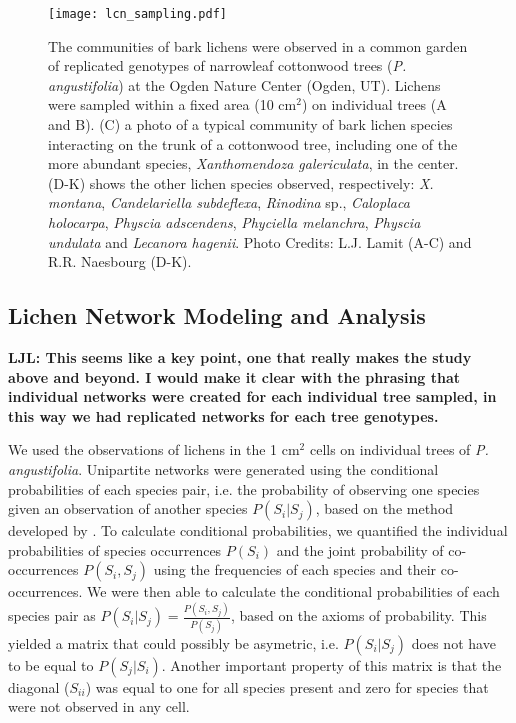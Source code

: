 \documentclass[9pt,twocolumn,twoside,lineno]{pnas-new}
\begin{document}
{\begin{figure}[ht]
\centering
\texttt{[image: lcn\_sampling.pdf]}
\caption{The communities of bark lichens were observed in a common
  garden of replicated genotypes of narrowleaf cottonwood trees
  (\textit{P. angustifolia}) at the Ogden Nature Center (Ogden,
  UT). Lichens were sampled within a fixed area (10 cm$^2$) on
  individual trees (A and B). (C) a photo of a typical community of
  bark lichen species interacting on the trunk of a cottonwood tree,
  including one of the more abundant species, \textit{Xanthomendoza
    galericulata}, in the center. (D-K) shows the other lichen species
  observed, respectively:  \textit{X. montana}, \textit{Candelariella
    subdeflexa}, \textit{Rinodina} sp., \textit{Caloplaca holocarpa},
  \textit{Physcia adscendens}, \textit{Phyciella melanchra},
  \textit{Physcia undulata} and \textit{Lecanora hagenii}. Photo
  Credits: L.J. Lamit (A-C) and R.R. Naesbourg (D-K).}
\label{fig:lichen_sampling}
\end{figure}


\subsection*{Lichen Network Modeling and Analysis}

\textbf{LJL: This seems like a key point, one that really makes the
  study above and beyond.  I would make it clear with the phrasing
  that individual networks were created for each individual tree
  sampled, in this way we had replicated networks for each tree
  genotypes.}

We used the observations of lichens in the 1 cm$^2$ cells on individual
trees of \textit{P. angustifolia}. Unipartite networks were generated
using the conditional probabilities of each species pair, i.e. the
probability of observing one species given an observation of another
species $P(S_i | S_j)$, based on the method developed by
\citep{Araujo2011}. To calculate conditional probabilities, we
quantified the individual probabilities of species occurrences
$P(S_i)$ and the joint probability of co-occurrences $P(S_i,S_j)$
using the frequencies of each species and their co-occurrences. We
were then able to calculate the conditional probabilities of each
species pair as $P(S_i|S_j) = \frac{P(S_i,S_j)}{P(S_j)}$, based on the
axioms of probability. This yielded a matrix that could possibly be
asymetric, i.e. $P(S_i|S_j)$ does not have to be equal to
$P(S_j|S_i)$. Another important property of this matrix is that the
diagonal ($S_{ii}$) was equal to one for all species present and zero
for species that were not observed in any cell.

}
\end{document}
